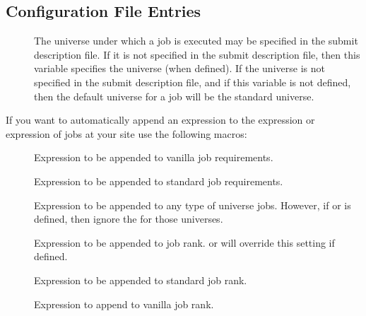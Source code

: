 \subsection{\label{sec:Submit-Config-File-Entries}
Configuration File Entries}
\begin{description}
\item[] \label{param:DefaultUniverse}
The universe under which a job is executed may be specified in the submit
description file.
If it is not specified in the submit description file, then
this variable specifies the universe (when defined).
If the universe is not specified in the submit description
file, and if this variable is not defined, then
the default universe for a job will be the standard universe.
\end{description}

If you want  to automatically append an expression to
the  expression or  expression of 
jobs at your site use the following macros:
\begin{description}
  
\item[] \label{param:AppendReqVanilla}
  Expression to be appended to vanilla job requirements.
  
\item[] \label{param:AppendReqStandard}
  Expression to be appended to standard job requirements.

\item[] \label{param:AppendReq}
  Expression to be appended to any type of universe jobs. 
  However, if  or 
  is defined, then ignore the  for those
  universes.

\item[] \label{param:AppendRank}
  Expression to be appended to job rank.   or
     will override this setting if defined.

\item[] \label{param:AppendRankStandard}
  Expression to be appended to standard job rank.

\item[] \label{param:AppendRankVanilla}
  Expression to append to vanilla job rank.

\end{description}

